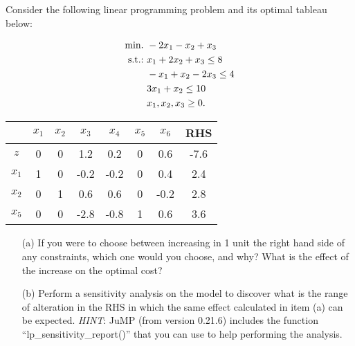 Consider the following linear programming problem and its optimal tableau below:

\begin{align*}
	\mathop{\text{min.~}} & -2x_1 - x_2 + x_3 \\
	\mathop{\text{s.t.:~}}   & x_1 + 2x_2 + x_3 \le 8 \\
		  & -x_1 + x_2 - 2x_3 \le 4 \\
		  & 3x_1 + x_2 \le 10 \\
		  & x_1, x_2, x_3 \ge 0.	 
\end{align*}

\begin{center}
	\begin{tabular}{c|cccccc|c}
		        & $x_1$ & $x_2$ & $x_3$ & $x_4$ & $x_5$ & $x_6$ & RHS \\
		\hline
		    $z$ &   0   &   0   &   1.2 &   0.2 &   0   &   0.6 & -7.6 \\
		\hline
		  $x_1$ &   1   &   0   &  -0.2 &  -0.2 &   0   &   0.4 &  2.4  \\
		  $x_2$ &   0   &   1   &   0.6 &   0.6 &   0   &  -0.2 &  2.8  \\
		  $x_5$ &   0   &   0   &  -2.8 &  -0.8 &   1   &   0.6 &  3.6  \\
	\end{tabular}	
\end{center}


\begin{itemize}
	\item [(a)] If you were to choose between increasing in 1 unit the right hand side of any constraints, which one would you choose, and why? What is the effect of the increase on the optimal cost?
	\item [(b)] Perform a sensitivity analysis on the model to discover what is the range of alteration in the RHS in which the same effect calculated in item (a) can be expected. \emph{HINT}: JuMP (from version 0.21.6) includes the function ``lp\_sensitivity\_report()'' that you can use to help performing the analysis.
\end{itemize}
